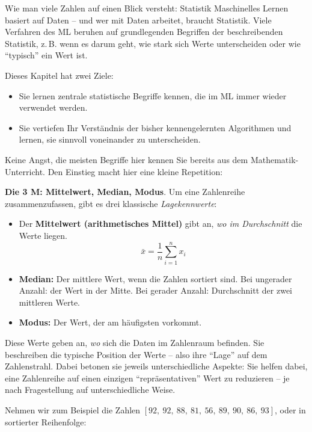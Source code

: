 \begin{lpu}{Wie man viele Zahlen auf einen Blick versteht: Statistik}
Maschinelles Lernen basiert auf Daten – und wer mit Daten arbeitet, braucht Statistik. Viele Verfahren des ML beruhen auf grundlegenden Begriffen der beschreibenden Statistik, z.\,B. wenn es darum geht, wie stark sich Werte unterscheiden oder wie ``typisch'' ein Wert ist.

Dieses Kapitel hat zwei Ziele:
\begin{itemize}
  \item Sie lernen zentrale statistische Begriffe kennen, die im ML immer wieder verwendet werden.
  \item Sie vertiefen Ihr Verständnis der bisher kennengelernten Algorithmen und lernen, sie sinnvoll voneinander zu unterscheiden.
\end{itemize}

Keine Angst, die meisten Begriffe hier kennen Sie bereits aus dem Mathematik-Unterricht. Den Einstieg macht hier eine kleine Repetition:

\begin{theorie}
\textbf{Die 3 M: Mittelwert, Median, Modus}. Um eine Zahlenreihe zusammenzufassen, gibt es drei klassische \textit{Lagekennwerte}:

\begin{itemize}
  \item Der \textbf{Mittelwert (arithmetisches Mittel)} gibt an, \emph{wo im Durchschnitt} die Werte liegen.
    \[
    \bar{x} = \frac{1}{n} \sum_{i=1}^{n} x_i
    \]

  \item \textbf{Median:} Der mittlere Wert, wenn die Zahlen sortiert sind. Bei ungerader Anzahl: der Wert in der Mitte. Bei gerader Anzahl: Durchschnitt der zwei mittleren Werte.

  \item \textbf{Modus:} Der Wert, der am häufigsten vorkommt.
\end{itemize}
\end{theorie}

Diese Werte geben an, \textit{wo} sich die Daten im Zahlenraum befinden. Sie beschreiben die typische Position der Werte – also ihre ``Lage'' auf dem Zahlenstrahl. Dabei betonen sie jeweils unterschiedliche Aspekte: Sie helfen dabei, eine Zahlenreihe auf einen einzigen ``repräsentativen'' Wert zu reduzieren – je nach Fragestellung auf unterschiedliche Weise.

Nehmen wir zum Beispiel die Zahlen $[92,\ 92,\ 88,\ 81,\ 56,\ 89,\ 90,\ 86,\ 93]$, oder in sortierter Reihenfolge:


\end{lpu}

